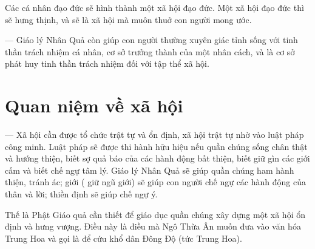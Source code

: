 Các cá nhân đạo đức sẽ hình thành một xã hội đạo đức. Một xã hội đạo đức thì sẽ hưng thịnh, và sẽ là xã hội mà muôn thuở con người mong ước.

--- Giáo lý Nhân Quả còn giúp con người thường xuyên giác tỉnh sống với tinh thần trách nhiệm cá nhân, cơ sở trưởng thành của một nhân cách, và là cơ sở phát huy tinh thần trách nhiệm đối với tập thể xã hội.

\section{Quan niệm về xã hội} %
\label{sec:87_xa_hoi}

--- Xã hội cần được tổ chức trật tự và ổn định, xã hội trật tự nhờ vào luật pháp công minh. Luật pháp sẽ được thi hành hữu hiệu nếu quần chúng sống chân thật và hướng thiện, biết sợ quả báo của các hành động bất thiện, biết giữ gìn các giới cấm và biết chế ngự tâm lý. Giáo lý Nhân Quả sẽ giúp quần chúng ham hành thiện, tránh ác; giới ( giữ ngũ giới) sẽ giúp con người chế ngự các hành động của thân và lời; thiền định sẽ giúp chế ngự ý.

Thế là Phật Giáo quả cần thiết để giáo dục quần chúng xây dựng một xã hội ổn định và hưng vượng. Điều này là điều mà Ngô Thừa Ân muốn đưa vào văn hóa Trung Hoa và gọi là để cứu khổ dân Đông Độ (tức Trung Hoa).

